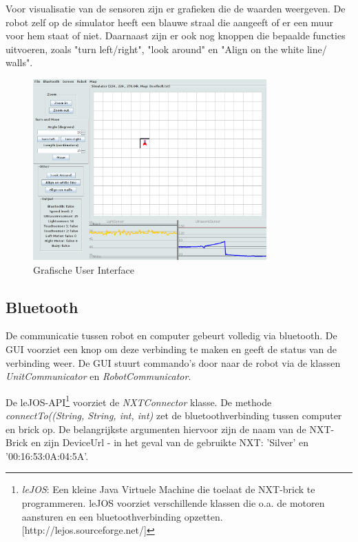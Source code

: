 \documentclass[tt3]{penoverslag}
\begin{document}
Voor visualisatie van de sensoren zijn er grafieken die de waarden weergeven. De robot zelf op de simulator heeft een blauwe straal die aangeeft of er een muur voor hem staat of niet. Daarnaast zijn er ook nog knoppen die bepaalde functies uitvoeren, zoals "turn left/right", "look around" en "Align on the white line/ walls".

\begin{figure}[tbp]
\begin{center}
    \includegraphics[width=0.8\textwidth]{GUI}
    \caption{Grafische User Interface}
	\label{fig:gui}
\end{center}
\end{figure}

\subsection{Bluetooth} %
\label{ssec:bluetooth}
De communicatie tussen robot en computer gebeurt volledig via bluetooth. De GUI voorziet een knop om deze verbinding te maken en geeft de status van de verbinding weer. De GUI stuurt commando's door naar de robot via de klassen \textit{UnitCommunicator} en \textit{RobotCommunicator}.

De leJOS-API\footnote{\textit{leJOS}:  Een kleine Java Virtuele Machine die toelaat de NXT-brick te programmeren. leJOS voorziet verschillende klassen die o.a. de motoren aansturen en een bluetoothverbinding opzetten.  \mbox{[http://lejos.sourceforge.net/]}} voorziet de \textit{NXTConnector} klasse. De methode \textit{connectTo((String, String, int, int)} zet de bluetoothverbinding tussen computer en brick op. De belangrijkste argumenten hiervoor zijn de naam van de NXT-Brick en zijn DeviceUrl  - in het geval van de gebruikte NXT: 'Silver' en '00:16:53:0A:04:5A'.
\end{document}
